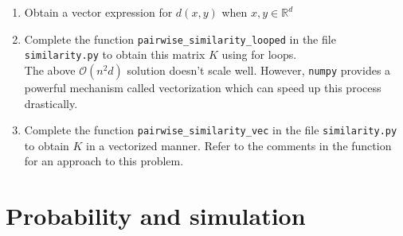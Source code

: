 \documentclass{article}
\begin{document}
\begin{enumerate}[leftmargin=*, label=(\alph*)]
\item Obtain a vector expression for $d(x,y)$ when $x , y \in \mathbb{R}^d$
\item Complete the function \texttt{pairwise\_similarity\_looped} in the file \texttt{similarity.py} to obtain this matrix $K$ using for loops. \\

The above $\mathcal{O}(n^2 d)$ solution doesn't scale well. However, \texttt{numpy} provides a powerful mechanism called vectorization which can speed up this process drastically. \\

\item Complete the function \texttt{pairwise\_similarity\_vec} in the file \texttt{similarity.py} to obtain $K$ in a vectorized manner. Refer to the comments in the function for an approach to this problem.

\end{enumerate}


\section{Probability and simulation}
\end{document}

